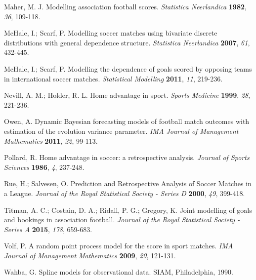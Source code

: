 \documentclass[journal,article,accept,moreauthors,pdftex,12pt,a4paper]{mdpi}
\begin{document}
\begin{thebibliography}{999}
        Maher, M. J. Modelling association football scores. {\em Statistica Neerlandica} {\bf 1982}, {\em 36}, 109-118.

        McHale, I.; Scarf, P. Modelling soccer matches using bivariate
        discrete distributions with general dependence structure. {\em
            Statistica Neerlandica} {\bf 2007}, {\em 61}, 432-445.

        McHale, I.; Scarf, P. Modelling the dependence of goals scored by
        opposing teams in international soccer matches. {\em Statistical
            Modelling} {\bf 2011}, {\em 11}, 219-236.

        Nevill, A. M.; Holder, R. L. Home advantage in sport. {\em Sports
            Medicine} {\bf 1999}, {\em 28}, 221-236.

        Owen, A. Dynamic Bayesian forecasting models of football match
        outcomes with estimation of the evolution variance parameter. {\em
            IMA Journal of Management Mathematics} {\bf 2011}, {\em 22}, 99-113.

        Pollard, R. Home advantage in soccer: a retrospective analysis. {\em Journal of Sports Sciences} {\bf 1986}, {\em 4}, 237-248.

        Rue, H.; Salvesen, O. Prediction and Retrospective Analysis of
        Soccer Matches in a League. {\em Journal of the Royal Statistical
            Society - Series D} {\bf 2000}, {\em 49}, 399-418.

        Titman, A. C.; Costain, D. A.; Ridall, P. G.; Gregory, K. Joint
        modelling of goals and bookings in association football. {\em
            Journal of the Royal Statistical Society - Series A} {\bf 2015},
        {\em 178}, 659-683.

        Volf, P. A random point process model for the score in sport
        matches. {\em IMA Journal of Management Mathematics} {\bf 2009},
        {\em 20}, 121-131.

        Wahba, G. Spline models for observational data. SIAM, Philadelphia,
        1990.

    \end{thebibliography}







\end{document}
